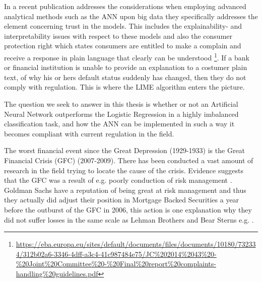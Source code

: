 In a recent publication \cite{EBA_BD_AA_2020} addresses the considerations when employing advanced analytical methods such as the ANN upon big data they specifically addresses the element concerning trust in the models. This includes the explainability- and interpretability issues with respect to these models and also the consumer protection right which states consumers are entitled to make a complain and receive a response in plain language that clearly can be understood \footnote{\url{https://eba.europa.eu/sites/default/documents/files/documents/10180/732334/312b02a6-3346-4dff-a3c4-41c987484e75/JC\%202014\%2043\%20-\%20Joint\%20Committee\%20-\%20Final\%20report\%20complaints-handling\%20guidelines.pdf}}. If a bank or financial institution is unable to provide an explanation to a costumer plain text, of why his or hers default status suddenly has changed, then they do not comply with regulation. This is where the LIME algorithm enters the picture. 

The question we seek to answer in this thesis is whether or not an Artificial Neural Network outperforms the Logistic Regression in a highly imbalanced classification task, and how the ANN can be implemented in such a way it becomes compliant with current regulation in the field. 

The worst financial event since the Great Depression (1929-1933) is the Great Financial Crisis (GFC) (2007-2009). There has been conducted a vast amount of research in the field trying to locate the cause of the crisis. Evidence suggests that the GFC was a result of e.g. poorly conduction of risk management \cite{risk_management1, risk_management2}. Goldman Sachs have a reputation of being great at risk management and thus they actually did adjust their position in Mortgage Backed Securities a year before the outburst of the GFC in 2006, this action is one explanation why they did not suffer losses in the same scale as Lehman Brothers and Bear Sterns e.g. \cite{risk_management_lessons}.

